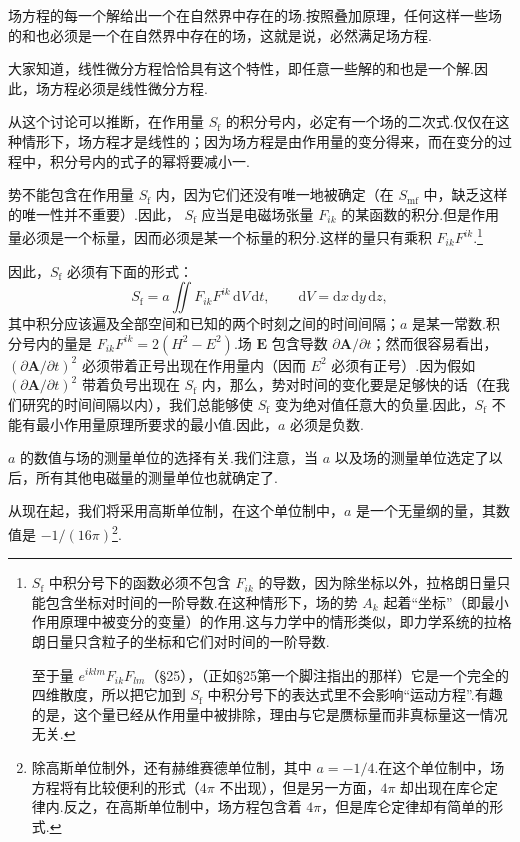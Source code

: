 场方程的每一个解给出一个在自然界中存在的场.按照叠加原理，任何这样一些场的和也必须是一个在自然界中存在的场，这就是说，必然满足场方程.

大家知道，线性微分方程恰恰具有这个特性，即任意一些解的和也是一个解.因此，场方程必须是线性微分方程.

从这个讨论可以推断，在作用量 $S_{\mathrm{f}}$
的积分号内，必定有一个场的二次式.仅仅在这种情形下，场方程才是线性的；因为场方程是由作用量的变分得来，而在变分的过程中，积分号内的式子的幂将要减小一.

势不能包含在作用量 $S_{\mathrm{f}}$
内，因为它们还没有唯一地被确定（在 $S_{\mathrm{mf}}$ 中，缺乏这样的唯一性并不重要）.因此，
$S_{\mathrm{f}}$ 应当是电磁场张量 $F_{ik}$
的某函数的积分.但是作用量必须是一个标量，因而必须是某一个标量的积分.这样的量只有乘积 $F_{ik}F^{ik}$.\footnote{$S_{\mathrm{f}}$ 中积分号下的函数必须不包含 $F_{ik}$ 的导数，因为除坐标以外，拉格朗日量只能包含坐标对时间的一阶导数.在这种情形下，场的势 $A_k$ 起着“坐标”（即最小作用原理中被变分的变量）的作用.这与力学中的情形类似，即力学系统的拉格朗日量只含粒子的坐标和它们对时间的一阶导数.\par 至于量 $e^{iklm}F_{ik}F_{lm}$（§25），（正如§25第一个脚注指出的那样）它是一个完全的四维散度，所以把它加到 $S_{\mathrm{f}}$ 中积分号下的表达式里不会影响“运动方程”.有趣的是，这个量已经从作用量中被排除，理由与它是赝标量而非真标量这一情况无关.}

因此，$S_{\mathrm{f}}$ 必须有下面的形式：
\begin{equation*}
  S_{\mathrm{f}}=a\iint F_{ik}F^{ik}\,\mathrm{d}V\,\mathrm{d}t,\qquad
  \mathrm{d}V=\mathrm{d}x\,\mathrm{d}y\,\mathrm{d}z,
\end{equation*}
其中积分应该遍及全部空间和已知的两个时刻之间的时间间隔；$a$
是某一常数.积分号内的量是 $F_{ik}F^{ik}=2(H^2-E^2)$.场 $\boldsymbol{E}$ 包含导数
$\partial\boldsymbol{A}/\partial t$；然而很容易看出，$(\partial\boldsymbol{A}/\partial t)^2$
必须带着正号出现在作用量内（因而 $E^2$
必须有正号）.因为假如 $(\partial\boldsymbol{A}/\partial t)^2$ 带着负号出现在
$S_{\mathrm{f}}$ 内，那么，势对时间的变化要是足够快的话（在我们研究的时间间隔以内），我们总能够使
$S_{\mathrm{f}}$ 变为绝对值任意大的负量.因此，$S_{\mathrm{f}}$
不能有最小作用量原理所要求的最小值.因此，$a$ 必须是负数.

$a$ 的数值与场的测量单位的选择有关.我们注意，当 $a$
以及场的测量单位选定了以后，所有其他电磁量的测量单位也就确定了.

从现在起，我们将采用高斯单位制，在这个单位制中，$a$ 是一个无量纲的量，其数值是 $-1/(16\pi)$\footnote{除高斯单位制外，还有赫维赛德单位制，其中 $a=-1/4$.在这个单位制中，场方程将有比较便利的形式（$4\pi$ 不出现），但是另一方面，$4\pi$ 却出现在库仑定律内.反之，在高斯单位制中，场方程包含着 $4\pi$，但是库仑定律却有简单的形式.}.

